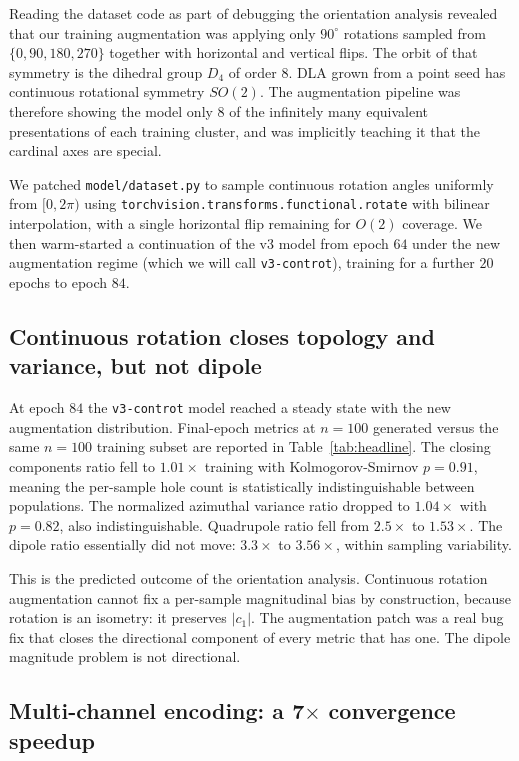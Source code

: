 \documentclass[11pt]{article}
\begin{document}
Reading the dataset code as part of debugging the orientation analysis revealed that our training augmentation was applying only $90^{\circ}$ rotations sampled from $\{0, 90, 180, 270\}$ together with horizontal and vertical flips. The orbit of that symmetry is the dihedral group $D_4$ of order $8$. DLA grown from a point seed has continuous rotational symmetry $SO(2)$. The augmentation pipeline was therefore showing the model only $8$ of the infinitely many equivalent presentations of each training cluster, and was implicitly teaching it that the cardinal axes are special.

We patched \texttt{model/dataset.py} to sample continuous rotation angles uniformly from $[0, 2\pi)$ using \texttt{torchvision.transforms.functional.rotate} with bilinear interpolation, with a single horizontal flip remaining for $O(2)$ coverage. We then warm-started a continuation of the v3 model from epoch $64$ under the new augmentation regime (which we will call \texttt{v3-controt}), training for a further $20$ epochs to epoch $84$.

\subsection{Continuous rotation closes topology and variance, but not dipole}

At epoch $84$ the \texttt{v3-controt} model reached a steady state with the new augmentation distribution. Final-epoch metrics at $n = 100$ generated versus the same $n = 100$ training subset are reported in Table~\ref{tab:headline}. The closing components ratio fell to $1.01\times$ training with Kolmogorov-Smirnov $p = 0.91$, meaning the per-sample hole count is statistically indistinguishable between populations. The normalized azimuthal variance ratio dropped to $1.04\times$ with $p = 0.82$, also indistinguishable. Quadrupole ratio fell from $2.5\times$ to $1.53\times$. The dipole ratio essentially did not move: $3.3\times$ to $3.56\times$, within sampling variability.

This is the predicted outcome of the orientation analysis. Continuous rotation augmentation cannot fix a per-sample magnitudinal bias by construction, because rotation is an isometry: it preserves $|c_1|$. The augmentation patch was a real bug fix that closes the directional component of every metric that has one. The dipole magnitude problem is not directional.

\subsection{Multi-channel encoding: a 7$\times$ convergence speedup}
\end{document}
